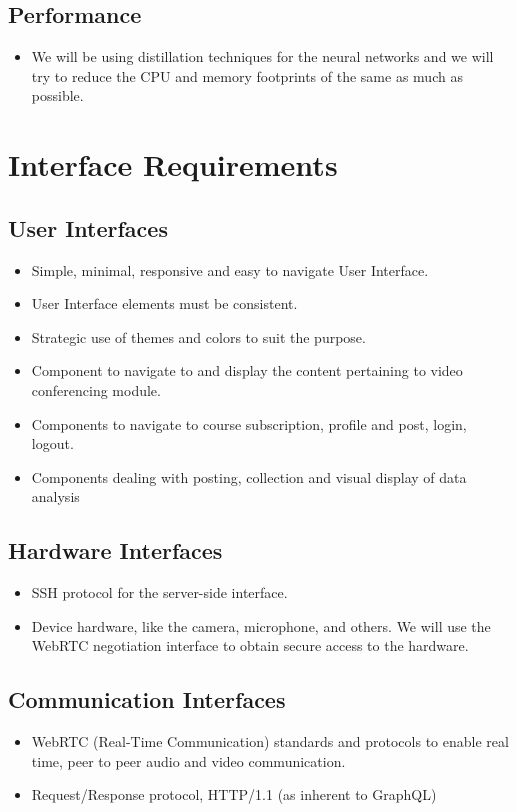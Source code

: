 \subsection{Performance}
\begin{itemize}
    \item We will be using distillation techniques for the neural networks 
    and we will try to reduce the CPU and memory footprints of the same as much as possible.
\end{itemize}

\section{Interface Requirements}

\subsection{User Interfaces}
\begin{itemize}
    \item Simple, minimal, responsive and easy to navigate User Interface.
    \item User Interface elements must be consistent.
    \item Strategic use of themes and colors to suit the purpose.
    \item Component to navigate to and display the content pertaining to video conferencing module.
    \item Components to navigate to course subscription, profile and post, login, logout.
    \item Components dealing with posting, collection and visual display of data analysis
\end{itemize}

\subsection{Hardware Interfaces}
\begin{itemize}
    \item SSH protocol for the server-side interface.
    \item Device hardware, like the camera, microphone, and others. 
    We will use the WebRTC negotiation interface to obtain secure access to the hardware.
\end{itemize}

\subsection{Communication Interfaces}
\begin{itemize}
    \item WebRTC (Real-Time Communication) standards and protocols to enable real time, peer to peer audio and video communication.
    \item Request/Response protocol, HTTP/1.1 (as inherent to GraphQL)
\end{itemize}

